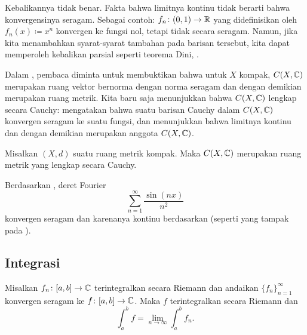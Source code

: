 Kebalikannya tidak benar. Fakta bahwa limitnya kontinu tidak berarti
bahwa konvergensinya seragam. Sebagai contoh:
$f_n \colon (0,1) \to {\mathbb{R}}$ yang didefinisikan oleh $f_n(x) \coloneqq x^n$ konvergen ke
fungsi nol, tetapi tidak secara seragam. Namun, jika kita menambahkan syarat-syarat tambahan
pada barisan tersebut, kita dapat memperoleh kebalikan parsial seperti teorema Dini,
.

Dalam , pembaca diminta untuk membuktikan
bahwa untuk $X$ kompak, $C(X,{\mathbb{C}})$ merupakan ruang vektor bernorma
dengan norma seragam dan dengan demikian merupakan ruang metrik. Kita baru saja menunjukkan bahwa
$C(X,{\mathbb{C}})$ lengkap secara Cauchy:  mengatakan bahwa suatu barisan Cauchy
dalam $C(X,{\mathbb{C}})$ konvergen seragam ke suatu fungsi,
dan  menunjukkan bahwa limitnya
kontinu dan dengan demikian merupakan anggota $C(X,{\mathbb{C}})$.

\begin{cor}
Misalkan $(X,d)$ suatu ruang metrik kompak.
Maka $C(X,{\mathbb{C}})$ merupakan ruang metrik yang lengkap secara Cauchy.
\end{cor}

\begin{example}
Berdasarkan ,
deret Fourier
\begin{equation*}
\sum_{n=1}^\infty \frac{\sin(nx)}{n^2}
\end{equation*}
konvergen seragam dan karenanya kontinu berdasarkan  (seperti yang tampak
pada ).
\end{example}

\subsection{Integrasi}

\begin{prop} \label{prop:complexlimitswapintegral}
Misalkan $f_n \colon [a,b] \to {\mathbb{C}}$
terintegralkan secara Riemann dan andaikan $\{ f_n \}_{n=1}^\infty$ konvergen
seragam ke $f \colon [a,b] \to {\mathbb{C}}$. Maka $f$ terintegralkan secara Riemann
dan
\begin{equation*}
\int_a^b f = \lim_{n\to \infty} \int_a^b f_n .
\end{equation*}
\end{prop}

